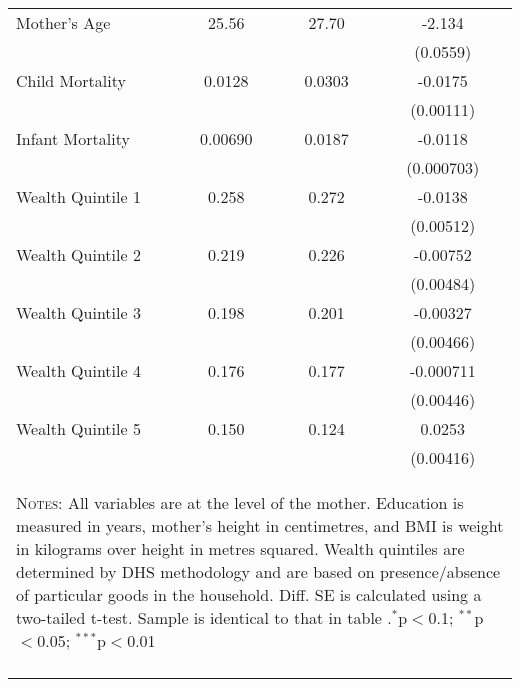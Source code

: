 \begin{table}[htbp]
\begin{tabular}{l*{1}{ccc}}
Mother's Age        &       25.56&       27.70&      -2.134\sym{***}\\
                    &            &            &    (0.0559)         \\
Child Mortality     &      0.0128&      0.0303&     -0.0175\sym{***}\\
                    &            &            &   (0.00111)         \\
Infant Mortality    &     0.00690&      0.0187&     -0.0118\sym{***}\\
                    &            &            &  (0.000703)         \\
Wealth Quintile 1   &       0.258&       0.272&     -0.0138\sym{**} \\
                    &            &            &   (0.00512)         \\
Wealth Quintile 2   &       0.219&       0.226&    -0.00752         \\
                    &            &            &   (0.00484)         \\
Wealth Quintile 3   &       0.198&       0.201&    -0.00327         \\
                    &            &            &   (0.00466)         \\
Wealth Quintile 4   &       0.176&       0.177&   -0.000711         \\
                    &            &            &   (0.00446)         \\
Wealth Quintile 5   &       0.150&       0.124&      0.0253\sym{***}\\
                    &            &            &   (0.00416)         \\
\midrule\midrule


\multicolumn{4}{p{10.4cm}}{\begin{footnotesize}\textsc{Notes:} All variables are at the level of the mother.  Education is measured in years, mother's height in centimetres, and BMI is weight in kilograms over height in metres squared.  Wealth quintiles are determined by DHS methodology and are based on presence/absence of particular goods in the household. Diff. SE is calculated using a two-tailed t-test.  Sample is identical to that in table \label{TWINtab:sumstats}.$^{*}$p$<$0.1; $^{**}$p$<$0.05; $^{***}$p$<$0.01\end{footnotesize}}
\\\bottomrule\normalsize\end{tabular}\end{table} 
